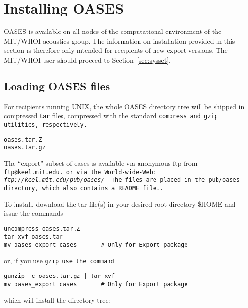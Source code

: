 \section{Installing OASES}

OASES is available on all nodes of the computational environment of
the MIT/WHOI acoustics group. The information on installation provided
in this section is therefore only intended for recipients of new
export versions. The MIT/WHOI user should proceed to Section~\ref{sec:sysset}. 

\subsection{Loading OASES files}

For recipients running UNIX, the whole OASES directory tree will be
shipped in compressed {\bf tar} files, compressed with the standard \tt compress \rm and \tt gzip \rm utilities, respectively.

\begin{verbatim}
oases.tar.Z
oases.tar.gz
\end{verbatim}

The ``export'' subset of oases is available via anonymous ftp from \tt
ftp@keel.mit.edu. \rm  or via the World-wide-Web: {\em
ftp://keel.mit.edu/pub/oases/ }
The files are placed in the \tt pub/oases \rm directory, which also
contains a \tt README \rm file..

\noindent To install, download the tar file(s) in your desired root directory
\$HOME and issue the commands

\begin{verbatim}
uncompress oases.tar.Z
tar xvf oases.tar
mv oases_export oases		# Only for Export package
\end{verbatim}

\noindent or, if you use \tt gzip \rm use the  command

\begin{verbatim}
gunzip -c oases.tar.gz | tar xvf -
mv oases_export oases		# Only for Export package
\end{verbatim}

\noindent which will install the directory tree:

